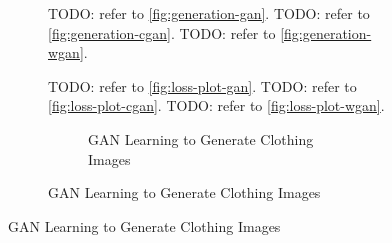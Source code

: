 \documentclass[conference]{IEEEtran}
\begin{document}
\begin{figure}[!h]
\begin{figure}[!h]
    TODO: refer to \autoref{fig:generation-gan}.
    TODO: refer to \autoref{fig:generation-cgan}.
    TODO: refer to \autoref{fig:generation-wgan}.

    TODO: refer to \autoref{fig:loss-plot-gan}.
    TODO: refer to \autoref{fig:loss-plot-cgan}.
    TODO: refer to \autoref{fig:loss-plot-wgan}.

    \begin{figure}
        \caption{GAN Learning to Generate Clothing Images}
        \label{fig:generation-gan}
        \centering
    \end{figure}


\end{figure}
\end{figure}
\end{document}
